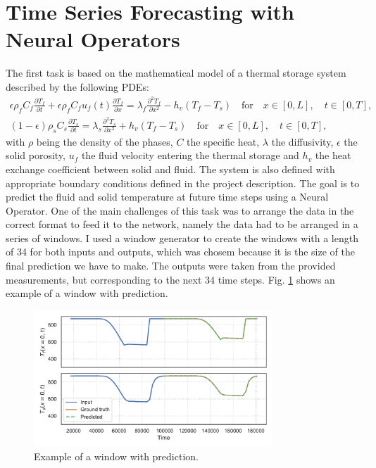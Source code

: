 \documentclass[unicode,11pt,a4paper,oneside,numbers=endperiod,openany]{scrartcl}
\begin{document}
\section{Time Series Forecasting with Neural Operators}\label{sec:task1}
The first task is based on the mathematical model of a thermal storage system
described by the following PDEs:
\begin{align}
    \epsilon \rho_f C_f \frac{\partial T_f}{\partial t} + \epsilon \rho_f C_f u_f(t) \frac{\partial T_f}{\partial x} = \lambda_f \frac{\partial^2 T_f}{\partial x^2} - h_v(T_f - T_s) \quad \text{for} \quad x \in [0, L], \quad t \in [0, T],
    \\
    (1-\epsilon)\rho_s C_s\frac{\partial T_s}{\partial t} = \lambda_s \frac{\partial^2 T_s}{\partial x^2} + h_v(T_f - T_s) \quad \text{for} \quad x \in [0, L], \quad t \in [0, T],
\end{align}
with $\rho$ being the density of the phases, $C$ the specific heat, $\lambda$ the diffusivity, $\epsilon$ the solid porosity, $u_f$
the fluid velocity entering the thermal storage and $h_v$ the heat exchange
coefficient between solid and fluid.
The system is also defined with appropriate boundary conditions defined in the
project description.
The goal is to predict the fluid and solid temperature at future time steps
using a Neural Operator.
One of the main challenges of this task was to arrange the data in the correct
format to feed it to the network, namely the data had to be arranged in a
series of windows. I used a window generator to create the windows with a length
of 34 for both inputs and outputs, which was chosem because it is the size of the
final prediction we have to make. 
The outputs were taken from the provided measurements, but corresponding to the
next 34 time steps. Fig. \ref{fig:window} shows an example of a window with
prediction.
\begin{figure}[ht!]
    \centering
    \includegraphics[width=0.8\textwidth]{../task1/fno/plot_window_5.pdf}
    \caption{Example of a window with prediction.}
    \label{fig:window}
\end{figure}
\end{document}
